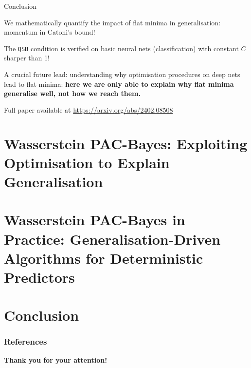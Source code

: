 \documentclass{presentation}
\begin{document}
\begin{xframe}{Conclusion}
    \vspace{1cm}
    \Large
    \begin{xitemize}
        \item We mathematically quantify the impact of flat minima in generalisation: momentum in Catoni's bound!
        \item The \texttt{QSB} condition is verified on basic neural nets (classification) with constant $C$ sharper than 1! 
        \item A crucial future lead: understanding why optimisation procedures on deep nets lead to flat minima: \textbf{here we are only able to explain why flat minima generalise well, not how we reach them.}
    \end{xitemize}

    Full paper available at \url{https://arxiv.org/abs/2402.08508}
    
\end{xframe}

\section{Wasserstein PAC-Bayes: Exploiting Optimisation to Explain Generalisation}

\section{Wasserstein PAC-Bayes in Practice: Generalisation-Driven Algorithms for Deterministic Predictors}

\section{Conclusion}









\appendix

\begin{frame}
  \frametitle{References}
  \printbibliography[title={References}]
 \end{frame}

\begin{xtitle}

\vspace{2.0cm}
{\bf Thank you for your attention!}\\

\end{xtitle}

 
\end{document}

